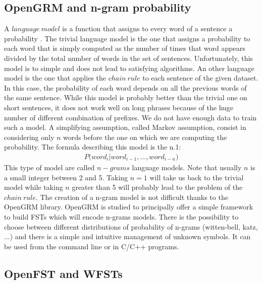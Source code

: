 \documentclass[11pt,a4paper]{article}
\begin{document}
\subsection{OpenGRM and n-gram probability}

A $language\ model$ is a function that assigns to every word of a sentence a probability \cite{language_model}. The trivial language model is the one that assigns a probability to each word that is simply computed as the number of times that word appears divided by the total number of words in the set of sentences. Unfortunately, this model is to simple and does not lead to satisfying algorithms. An other language model is the one that applies the $chain\ rule$ to each sentence of the given dataset. In this case, the probability of each word depends on all the previous words of the same sentence. While this model is probably better than the trivial one on short sentences, it does not work well on long phrases because of the huge number of different combination of prefixes. We do not have enough data to train such a model. A simplifying assumption, called Markov assumption, consist in considering only $n$ words before the one on which we are computing the probability. The formula describing this model is the n.1:
\begin{multline}
P \big( word_{i} | word_{i-1}, ..., word_{i-n} \big)
\end{multline}
This type of model are called $n-grams$ language models. Note that usually $n$ is a small integer between 2 and 5. Taking $n = 1$ will take us back to the trivial model while taking $n$ greater than 5 will probably lead to the problem of the $chain\ rule$. The creation of a n-gram model is not difficult thanks to the OpenGRM library. OpenGRM is studied to principally offer a simple framework to build FSTs which will encode n-grams models. There is the possibility to choose between different distributions of probability of n-grams (witten-bell, katz, ...) and there is a simple and intuitive management of unknown symbols. It can be used from the command line or in C/C++ programs.

\subsection{OpenFST and WFSTs}
\end{document}

